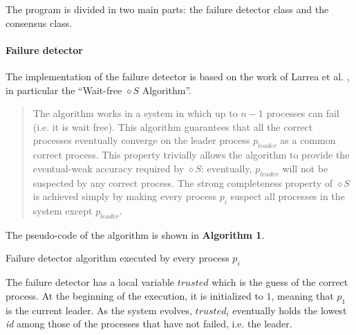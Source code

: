 \documentclass[a4paper]{article}
\begin{document}
The program is divided in two main parts: the failure detector class and the consensus class.

\paragraph{Failure detector}
The implementation of the failure detector is based on the work of Larrea et al. \cite{larrea2013}, in particular the ``Wait-free $\diamond{}S$ Algorithm''.
\begin{quote}
The algorithm works in a system in which up to $n - 1$ processes can fail (i.e. it is wait free). This algorithm guarantees that all the correct processes eventually converge on the leader process $p_{leader}$ as a common correct process. This property trivially allows the algorithm to provide the eventual-weak accuracy required by $\diamond{}S$: eventually, $p_{leader}$ will not be suspected by any correct process. The strong completeness property of $\diamond{}S$ is achieved simply by making every process $p_i$ suspect all processes in the system except $p_{leader}$.
\end{quote}

The pseudo-code of the algorithm is shown in \textbf{Algorithm 1}.

\begin{algorithm}[H]

 \caption{Failure detector algorithm executed by every process $p_i$}
\end{algorithm}
The failure detector has a local variable $trusted$ which is the guess of the correct process. At the beginning of the execution, it is initialized to $1$, meaning that $p_1$ is the current leader.
As the system evolves, $trusted_i$ eventually holds the lowest \emph{id} among those of the processes that have not failed, i.e. the leader.
\end{document}
